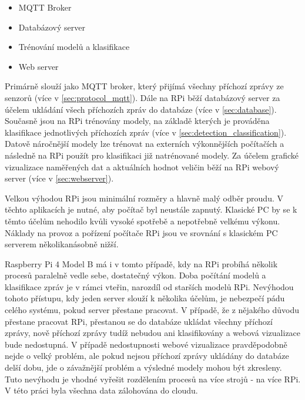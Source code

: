 \begin{itemize}
  \item MQTT Broker
  \item Databázový server
  \item Trénování modelů a klasifikace
  \item Web server
\end{itemize}

Primárně slouží jako MQTT broker, který přijímá všechny příchozí zprávy ze senzorů (více v \cref{sec:protocol_mqtt}). Dále na RPi běží databázový server za účelem ukládání všech příchozích zpráv do databáze (více v \cref{sec:database}). Současně jsou na RPi trénovány modely, na základě kterých je prováděna klasifikace jednotlivých příchozích zpráv (více v \cref{sec:detection_classification}). Datově náročnější modely lze trénovat na externích výkonnějších počítačích a následně na RPi použít pro klasifikaci již natrénované modely. Za účelem grafické vizualizace naměřených dat a aktuálních hodnot veličin běží na RPi webový server (více v \cref{sec:webserver}). 

Velkou výhodou RPi jsou minimální rozměry a hlavně malý odběr proudu. V těchto aplikacích je nutné, aby počítač byl neustále zapnutý. Klasické PC by se k těmto účelům nehodilo kvůli vysoké spotřebě a nepotřebně velkému výkonu. Náklady na provoz a pořízení počítače RPi jsou ve srovnání s klasickém PC serverem několikanásobně nižší. 

Raspberry Pi 4 Model B má i v tomto případě, kdy na RPi probíhá několik procesů paralelně vedle sebe, dostatečný výkon. Doba počítání modelů a klasifikace zpráv je v rámci vteřin, narozdíl od starších modelů RPi. Nevýhodou tohoto přístupu, kdy jeden server slouží k několika účelům, je nebezpečí pádu celého systému, pokud server přestane pracovat. V případě, že z nějakého důvodu přestane pracovat RPi, přestanou se do databáze ukládat všechny příchozí zprávy, nově příchozí zprávy tudíž nebudou ani klasifikovány a webová vizualizace bude nedostupná. V případě nedostupnosti webové vizualizace pravděpodobně nejde o velký problém, ale pokud nejsou příchozí zprávy ukládány do databáze delší dobu, jde o závažnější problém a výsledné modely mohou být zkresleny. Tuto nevýhodu je vhodné vyřešit rozdělením procesů na více strojů - na více RPi. V této práci byla všechna data zálohována do cloudu.